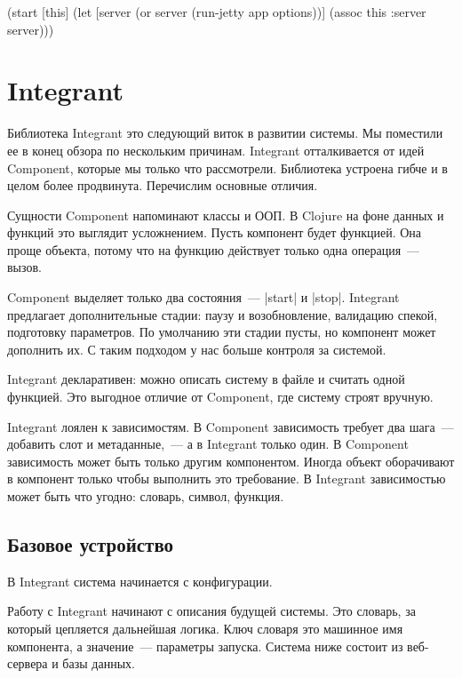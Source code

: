 \begin{english}
  \begin{clojure}
(start [this]
  (let [server (or server (run-jetty app options))]
    (assoc this :server server)))
  \end{clojure}
\end{english}

\section{Integrant}

Библиотека Integrant это
следующий виток в развитии системы. Мы поместили ее в конец обзора по нескольким
причинам. Integrant отталкивается от идей Component, которые мы только что
рассмотрели. Библиотека устроена гибче и в целом более продвинута. Перечислим
основные отличия.

Сущности Component напоминают классы и ООП. В Clojure на фоне данных и функций
это выглядит усложнением. Пусть компонент будет функцией. Она проще объекта,
потому что на функцию действует только одна операция~--- вызов.

Component выделяет только два состояния~--- \spverb|start| и
\spverb|stop|. Integrant предлагает дополнительные стадии: паузу и
возобновление, валидацию спекой, подготовку параметров. По умолчанию эти стадии
пусты, но компонент может дополнить их. С таким подходом у нас больше контроля
за системой.

Integrant декларативен: можно описать систему в файле и считать одной
функцией. Это выгодное отличие от Component, где систему строят вручную.

Integrant лоялен к зависимостям. В Component зависимость требует два шага~---
добавить слот и метаданные,~--- а в Integrant только один. В Component
зависимость может быть только другим компонентом. Иногда объект оборачивают в
компонент только чтобы выполнить это требование. В Integrant зависимостью может
быть что угодно: словарь, символ, функция.

\subsection{Базовое устройство}

В Integrant система начинается с конфигурации.

Работу с Integrant начинают с описания будущей системы. Это словарь, за который
цепляется дальнейшая логика. Ключ словаря это машинное имя компонента, а
значение~--- параметры запуска. Система ниже состоит из веб-сервера и базы
данных.

